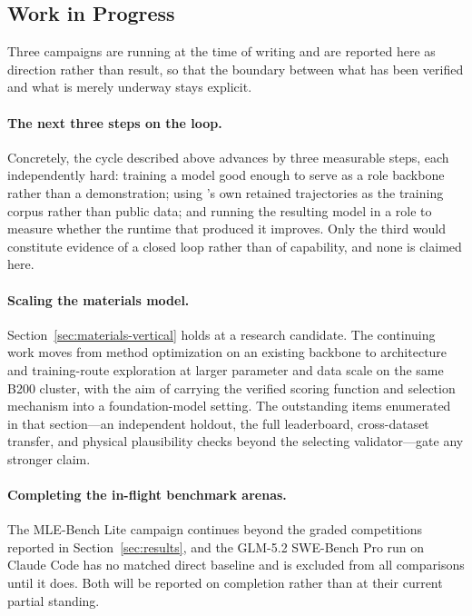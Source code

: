 \subsection{Work in Progress}

Three campaigns are running at the time of writing and are reported here as
direction rather than result, so that the boundary between what has been verified
and what is merely underway stays explicit.

\paragraph{The next three steps on the loop.}
Concretely, the cycle described above advances by three measurable steps, each
independently hard: training a model good enough to serve as a role backbone rather
than a demonstration; using \systemname{}'s own retained trajectories as the training
corpus rather than public data; and running the resulting model in a role to measure
whether the runtime that produced it improves. Only the third would constitute
evidence of a closed loop rather than of capability, and none is claimed here.

\paragraph{Scaling the materials model.}
Section~\ref{sec:materials-vertical} holds at a research candidate. The continuing
work moves from method optimization on an existing backbone to architecture and
training-route exploration at larger parameter and data scale on the same B200
cluster, with the aim of carrying the verified scoring function and selection
mechanism into a foundation-model setting. The outstanding items enumerated in that
section---an independent holdout, the full leaderboard, cross-dataset transfer, and
physical plausibility checks beyond the selecting validator---gate any stronger
claim.

\paragraph{Completing the in-flight benchmark arenas.}
The MLE-Bench Lite campaign continues beyond the \MLEGraded{} graded competitions
reported in Section~\ref{sec:results}, and the GLM-5.2 SWE-Bench Pro run on Claude
Code has no matched direct baseline and is excluded from all comparisons until it
does. Both will be reported on completion rather than at their current partial
standing.
